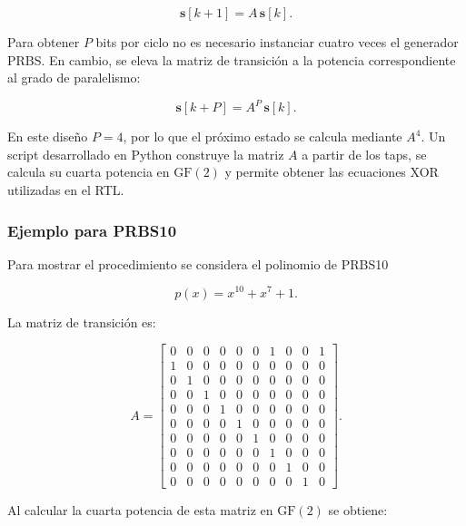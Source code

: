 \documentclass[10pt,a4paper]{article}
\begin{document}
\begin{equation}
    \mathbf{s}[k+1] = A\,\mathbf{s}[k].
    \label{eq:prbs-transicion-serial}
\end{equation}

Para obtener $P$ bits por ciclo no es necesario instanciar cuatro veces el generador PRBS. 
En cambio, se eleva la matriz de transición a la potencia correspondiente al grado de paralelismo:

\begin{equation}
    \mathbf{s}[k+P] = A^P\,\mathbf{s}[k].
    \label{eq:prbs-transicion-paralela}
\end{equation}

En este diseño $P=4$, por lo que el próximo estado se calcula mediante $A^4$. Un
script desarrollado en Python construye la matriz $A$ a partir de los taps, se calcula
su cuarta potencia en $\mathrm{GF}(2)$ y permite obtener las ecuaciones XOR utilizadas en el
RTL.

\subsubsection*{Ejemplo para PRBS10}

Para mostrar el procedimiento se considera el polinomio de PRBS10

\begin{equation}
    p(x)=x^{10}+x^7+1.
\end{equation}

La matriz de transición es:

\begingroup
\scriptsize
\begin{equation}
A=
\begin{bmatrix}
0&0&0&0&0&0&1&0&0&1\\
1&0&0&0&0&0&0&0&0&0\\
0&1&0&0&0&0&0&0&0&0\\
0&0&1&0&0&0&0&0&0&0\\
0&0&0&1&0&0&0&0&0&0\\
0&0&0&0&1&0&0&0&0&0\\
0&0&0&0&0&1&0&0&0&0\\
0&0&0&0&0&0&1&0&0&0\\
0&0&0&0&0&0&0&1&0&0\\
0&0&0&0&0&0&0&0&1&0
\end{bmatrix}.
\label{eq:prbs10-matriz-serial}
\end{equation}
\endgroup

Al calcular la cuarta potencia de esta matriz en $\mathrm{GF}(2)$ se obtiene:
\end{document}

